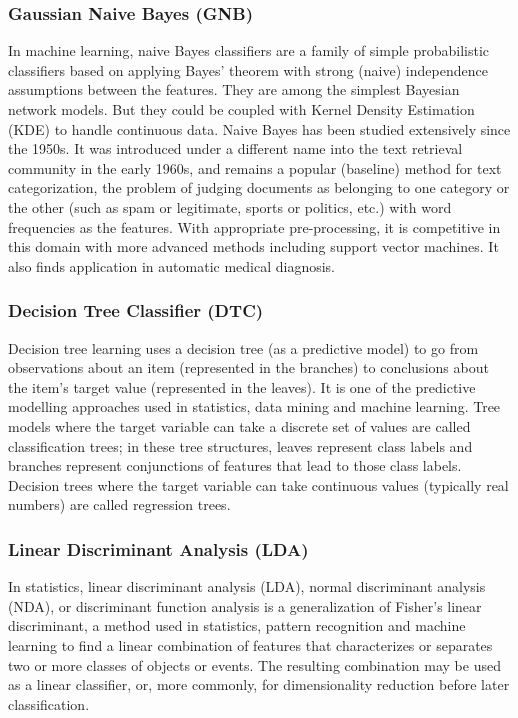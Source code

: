 	\subsubsection{Gaussian Naive Bayes (GNB)}
	In machine learning, naive Bayes classifiers are a family of simple probabilistic classifiers based on applying Bayes' theorem with strong (naive) independence assumptions between the features. They are among the simplest Bayesian network models. But they could be coupled with Kernel Density Estimation (KDE) to handle continuous data. Naive Bayes has been studied extensively since the 1950s. It was introduced under a different name into the text retrieval community in the early 1960s, and remains a popular (baseline) method for text categorization, the problem of judging documents as belonging to one category or the other (such as spam or legitimate, sports or politics, etc.) with word frequencies as the features. With appropriate pre-processing, it is competitive in this domain with more advanced methods including support vector machines. It also finds application in automatic medical diagnosis.
	
	\subsubsection{Decision Tree Classifier (DTC)}
	Decision tree learning uses a decision tree (as a predictive model) to go from observations about an item (represented in the branches) to conclusions about the item's target value (represented in the leaves). It is one of the predictive modelling approaches used in statistics, data mining and machine learning. Tree models where the target variable can take a discrete set of values are called classification trees; in these tree structures, leaves represent class labels and branches represent conjunctions of features that lead to those class labels. Decision trees where the target variable can take continuous values (typically real numbers) are called regression trees.
	
	\subsubsection{Linear Discriminant Analysis (LDA)}
	In statistics, linear discriminant analysis (LDA), normal discriminant analysis (NDA), or discriminant function analysis is a generalization of Fisher's linear discriminant, a method used in statistics, pattern recognition and machine learning to find a linear combination of features that characterizes or separates two or more classes of objects or events. The resulting combination may be used as a linear classifier, or, more commonly, for dimensionality reduction before later classification.
		
